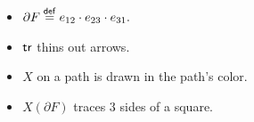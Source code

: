 \begin{frame}
\begin{columns}
\begin{column}{0.65\textwidth}
\vspace{12pt}
\begingroup
{}

\endgroup
\end{column}
\begin{column}{0.35\textwidth}
\begin{itemize}
\item \( \partial F\stackrel{\mathsf{def}}{=} e_{12}\cdot e_{23}\cdot e_{31}.  \)
\item \( \mathsf{tr} \) thins out arrows.
\item \( X \) on a path is drawn in the path's color.
\item \( X(\partial F) \) traces 3 sides of a square.
\end{itemize}
\end{column}
\end{columns}
\end{frame}

